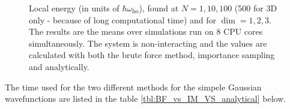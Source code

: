 \documentclass[
]{article}
\begin{document}
\begin{figure}[ht]
  \caption{Local energy (in units of $\hbar\omega_\text{ho}$), found at $N=1,10,100$ (500 for 3D only - because of long computational time)  and for $\dim= 1,2,3$. The results are the means over simulations run on 8 CPU cores simultaneously. The system is non-interacting and the values are calculated with both the brute force method, importance sampling and analytically.}
  \label{fig:BF_vs_IM_VS_analytical}
\end{figure}

The time used for the two different methods for the simpele Gaussian
wavefunctions are listed in the table \ref{tbl:BF_vs_IM_VS_analytical}
below.
\end{document}
